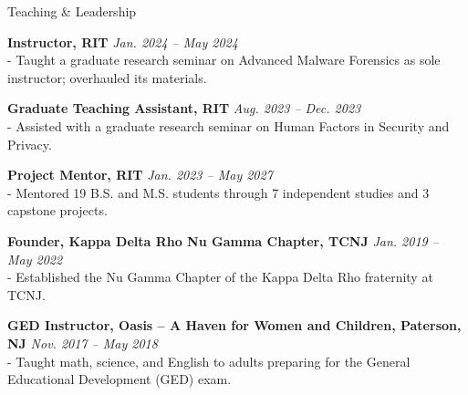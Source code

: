 \documentclass{cv} %
\newif\ifteachingdescs \teachingdescstrue %
\newcommand{\teachingdesc}[1]{\ifteachingdescs\\- #1\fi}
\newcommand{\tightentries}{\vspace*{\parskip}\setlength{\parskip}{0pt}} %
\begin{document}
\begin{rSection}{Teaching \& Leadership}
\ifteachingdescs\else\tightentries\fi

	{\textbf{Instructor, RIT}} \hfill {\em Jan. 2024 -- May 2024}
    \teachingdesc{Taught a graduate research seminar on Advanced Malware Forensics as sole instructor; overhauled its materials.}

	{\textbf{Graduate Teaching Assistant, RIT}} \hfill {\em Aug. 2023 -- Dec. 2023}
    \teachingdesc{Assisted with a graduate research seminar on Human Factors in Security and Privacy.}

   	{\textbf{Project Mentor, RIT}} \hfill {\em Jan. 2023 -- May 2027}
    \teachingdesc{Mentored 19 B.S. and M.S. students through 7 independent studies and 3 capstone projects.} %


   	{\textbf{Founder, Kappa Delta Rho Nu Gamma Chapter, TCNJ}} \hfill {\em Jan. 2019 -- May 2022}
    \teachingdesc{Established the Nu Gamma Chapter of the Kappa Delta Rho fraternity at TCNJ.}

   	{\textbf{GED Instructor, Oasis -- A Haven for Women and Children, Paterson, NJ}} \hfill {\em Nov. 2017 -- May 2018}
    \teachingdesc{Taught math, science, and English to adults preparing for the General Educational Development (GED) exam.}

\end{rSection}
\end{document}
